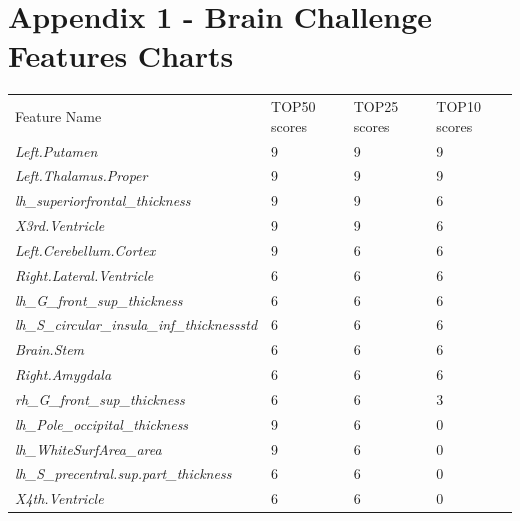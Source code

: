 \documentclass{article}
\begin{document}
\section*{Appendix 1 - Brain Challenge Features Charts} \label{sec:app1}
\begin{table}[h]
\begin{tabular}{llll}
Feature Name                                        & TOP50 scores & TOP25 scores & TOP10 scores    \\
\textit{Left.Putamen}                               & 9             & 9             & 9             \\
\textit{Left.Thalamus.Proper}                       & 9             & 9             & 9             \\
\textit{lh\_superiorfrontal\_thickness}             & 9             & 9             & 6             \\
\textit{X3rd.Ventricle}                             & 9             & 9             & 6             \\
\textit{Left.Cerebellum.Cortex}                     & 9             & 6             & 6             \\
\textit{Right.Lateral.Ventricle}                    & 6             & 6             & 6             \\
\textit{lh\_G\_front\_sup\_thickness}               & 6             & 6             & 6             \\
\textit{lh\_S\_circular\_insula\_inf\_thicknessstd} & 6             & 6             & 6             \\
\textit{Brain.Stem}                                 & 6             & 6             & 6             \\
\textit{Right.Amygdala}                             & 6             & 6             & 6             \\
\textit{rh\_G\_front\_sup\_thickness}               & 6             & 6             & 3             \\
\textit{lh\_Pole\_occipital\_thickness}             & 9             & 6             & 0             \\
\textit{lh\_WhiteSurfArea\_area}                    & 9             & 6             & 0             \\
\textit{lh\_S\_precentral.sup.part\_thickness}      & 6             & 6             & 0             \\
\textit{X4th.Ventricle}                             & 6             & 6             & 0             \\

\end{tabular}
\end{table}
\end{document}
